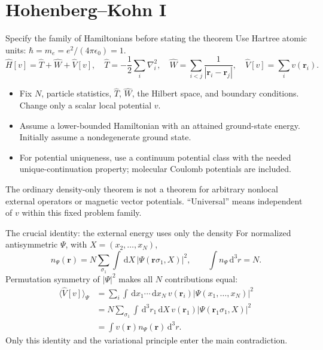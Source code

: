 \documentclass[aspectratio=169,10pt]{beamer}
\newcommand{\warnbox}[1]{\begin{tcolorbox}[colback=palewarm,colframe=warm,title={A trap to avoid}]#1\end{tcolorbox}}
\newcommand{\dd}{\,\mathrm d}
\newcommand{\rr}{\mathbf r}
\newcommand{\avg}[1]{\langle #1\rangle}
\begin{document}
\section{Hohenberg--Kohn I}
\begin{frame}{Specify the family of Hamiltonians before stating the theorem}
Use Hartree atomic units: $\hbar=m_e=e^2/(4\pi\epsilon_0)=1$.
\[
 \hat H[v]=\hat T+\hat W+\hat V[v],\quad
 \hat T=-\frac12\sum_i\nabla_i^2,\quad
 \hat W=\sum_{i<j}\frac1{|\rr_i-\rr_j|},\quad
 \hat V[v]=\sum_i v(\rr_i).
\]
\begin{itemize}
\item Fix $N$, particle statistics, $\hat T$, $\hat W$, the Hilbert space,
and boundary conditions. Change only a scalar local potential $v$.
\item Assume a lower-bounded Hamiltonian with an attained ground-state energy.
Initially assume a nondegenerate ground state.
\item For potential uniqueness, use a continuum potential class with the
needed unique-continuation property; molecular Coulomb potentials are included.
\end{itemize}
\warnbox{The ordinary density-only theorem is not a theorem for arbitrary
nonlocal external operators or magnetic vector potentials. ``Universal''
means independent of $v$ within this fixed problem family.}
\end{frame}

\begin{frame}{The crucial identity: the external energy uses only the density}
For normalized antisymmetric $\Psi$, with $X=(x_2,\ldots,x_N)$,
\[
 n_\Psi(\rr)=N\sum_{\sigma_1}\int\dd X\,
             |\Psi(\rr\sigma_1,X)|^2,\qquad \int n_\Psi\dd^3r=N.
\]
Permutation symmetry of $|\Psi|^2$ makes all $N$ contributions equal:
\begin{align*}
 \avg{\hat V[v]}_\Psi
 &=\sum_i\int\dd x_1\cdots\dd x_N\,
             v(\rr_i)|\Psi(x_1,\ldots,x_N)|^2\\
 &=N\sum_{\sigma_1}\int\dd^3r_1\dd X\,
             v(\rr_1)|\Psi(\rr_1\sigma_1,X)|^2\\
 &=\boxed{\int v(\rr)n_\Psi(\rr)\dd^3r}.
\end{align*}
Only this identity and the variational principle enter the main contradiction.
\end{frame}
\end{document}
